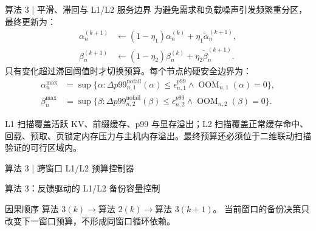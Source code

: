 \begin{frame}{算法 3 | 平滑、滞回与 L1/L2 服务边界}
  \small
  为避免需求和负载噪声引发频繁重分区，最终更新为：
  \begin{equation}
    \begin{aligned}
      \alpha_n^{(k+1)}
        &\leftarrow
        (1-\eta_1)\alpha_n^{(k)}
        +\eta_1\widetilde\alpha_n^{(k+1)},\\
      \beta_n^{(k+1)}
        &\leftarrow
        (1-\eta_2)\beta_n^{(k)}
        +\eta_2\widetilde\beta_n^{(k+1)}.
    \end{aligned}
    \label{eq:budget-smoothing}
  \end{equation}
  只有变化超过滞回阈值时才切换预算。每个节点的硬安全边界为：
  \begin{equation}
    \begin{aligned}
      \alpha_n^{\max}
      &=\sup\{\alpha:
        \Delta p99_{n,1}^{\mathrm{nofail}}(\alpha)\le\epsilon_{n,1}^{p99}
        \land \operatorname{OOM}_{n,1}(\alpha)=0\},\\
      \beta_n^{\max}
      &=\sup\{\beta:
        \Delta p99_{n,2}^{\mathrm{nofail}}(\beta)\le\epsilon_{n,2}^{p99}
        \land \operatorname{OOM}_{n,2}(\beta)=0\}.
    \end{aligned}
    \label{eq:tier-safety-caps}
  \end{equation}

  \scriptsize
  L1 扫描覆盖活跃 KV、前缀缓存、p99 与显存溢出；L2 扫描覆盖正常缓存命中、
  回载、预取、页锁定内存压力与主机内存溢出。最终预算还必须位于二维联动扫描
  验证的可行区域内。
\end{frame}

\begin{frame}{算法 3 | 跨窗口 L1/L2 预算控制器}
  \begin{paperalgo}{算法 3：反馈驱动的 L1/L2 备份容量控制}
  \end{paperalgo}

  \vspace{0.07cm}
  \begin{block}{因果顺序}
    \footnotesize
    $\text{算法 3}(k)\rightarrow\text{算法 2}(k)
    \rightarrow\text{算法 3}(k+1)$。
    当前窗口的备份决策只改变下一窗口预算，不形成同窗口循环依赖。
  \end{block}
\end{frame}
